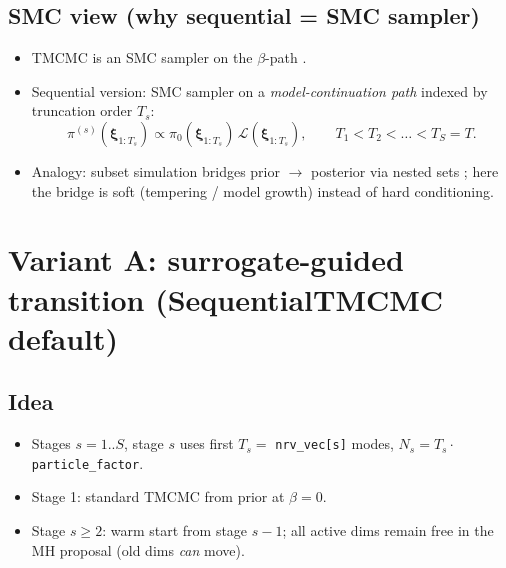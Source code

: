 \documentclass[11pt,a4paper]{article}
\newcommand{\bxi}{\boldsymbol{\xi}}          %
\newcommand{\bL}{\mathcal{L}}                 %
\newcommand{\bpi}{\pi}                        %
\newcommand{\Ntot}{N}
\begin{document}
\subsection{SMC view (why sequential = SMC sampler)}
\begin{itemize}
  \item TMCMC is an SMC sampler on the $\beta$-path \cite{delMoralSequentialMonteCarlo2006}.
  \item Sequential version: SMC sampler on a \emph{model-continuation path} indexed by truncation order $T_s$:
    \begin{equation}
      \bpi^{(s)}(\bxi_{1:T_s}) \propto \bpi_0(\bxi_{1:T_s})\,\bL(\bxi_{1:T_s}),\qquad T_1 < T_2 < \dots < T_S = T.
    \end{equation}
  \item Analogy: subset simulation bridges prior $\rightarrow$ posterior via nested sets \cite{auEstimationSmallFailure2001}; here the bridge is soft (tempering / model growth) instead of hard conditioning.
\end{itemize}

\section{Variant A: surrogate-guided transition (SequentialTMCMC default)}

\subsection{Idea}
\begin{itemize}
  \item Stages $s = 1..S$, stage $s$ uses first $T_s = $ \texttt{nrv\_vec[s]} modes, $\Ntot_s = T_s \cdot$ \texttt{particle\_factor}.
  \item Stage 1: standard TMCMC from prior at $\beta = 0$.
  \item Stage $s \ge 2$: warm start from stage $s-1$; all active dims remain free in the MH proposal (old dims \emph{can} move).
\end{itemize}
\end{document}
